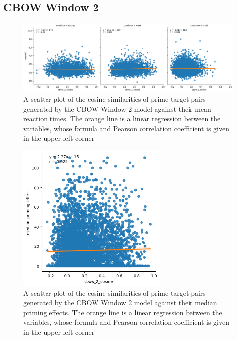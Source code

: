 \documentclass{IEEEtran}
\begin{document}
\subsection*{CBOW Window 2}
\begin{figure}[h]
    \centering
    \includegraphics[width=\textwidth]{images/cbow_2_cosine_against_meanrt.png}
    \caption{A scatter plot of the cosine similarities of prime-target pairs generated by the CBOW Window 2 model against their mean reaction times. The orange line is a linear regression between the variables, whose formula and Pearson correlation coefficient is given in the upper left corner.}
\end{figure}
\begin{figure}[h]
    \centering
    \includegraphics[width=0.65\textwidth]{images/cbow_2_cosine_against_priming_effect.png}
    \caption{A scatter plot of the cosine similarities of prime-target pairs generated by the CBOW Window 2 model against their median priming effects. The orange line is a linear regression between the variables, whose formula and Pearson correlation coefficient is given in the upper left corner.}
\end{figure}
\end{document}
